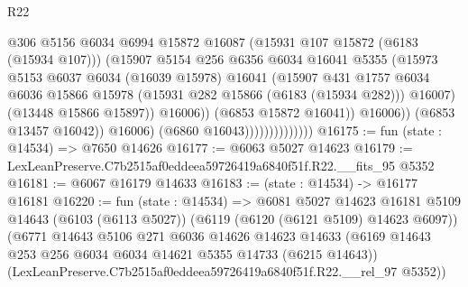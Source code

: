 \begin{lexlean}{R22}
\begin{coremodule}
                                          @306
                                          @5156
                                          @6034
                                          @6994
                                          @15872
                                          @16087
                                          (@15931 @107 @15872 (@6183 (@15934 @107)))
                                          (@15907
                                            @5154
                                            @256
                                            @6356
                                            @6034
                                            @16041
                                            @5355
                                            (@15973
                                              @5153
                                              @6037
                                              @6034
                                              (@16039 @15978)
                                              @16041
                                              (@15907
                                                @431
                                                @1757
                                                @6034
                                                @6036
                                                @15866
                                                @15978
                                                (@15931 @282 @15866 (@6183 (@15934 @282)))
                                                @16007)
                                              (@13448 @15866 @15897))
                                            @16006))
                                        (@6853 @15872 @16041))
                                      @16006))
                                  (@6853 @13457 @16042))
                                @16006)
                              (@6860 @16043))))))))))))))
@16175 := fun (state : @14534) => @7650 @14626
@16177 := @6063 @5027 @14623
@16179 := LexLeanPreserve.C7b2515af0eddeea59726419a6840f51f.R22.__fits_95 @5352
@16181 := @6067 @16179 @14633
@16183 := (state : @14534) -> @16177 @16181
@16220 := fun (state : @14534) =>
  @6081
    @5027
    @14623
    @16181
    @5109
    @14643
    (@6103 (@6113 @5027))
    (@6119 (@6120 (@6121 @5109) @14623 @6097))
    (@6771
      @14643
      @5106
      @271
      @6036
      @14626
      @14623
      @14633
      (@6169 @14643 @253 @256 @6034 @6034 @14621 @5355 @14733 (@6215 @14643))
      (LexLeanPreserve.C7b2515af0eddeea59726419a6840f51f.R22.__rel_97 @5352))

\end{coremodule}
\end{lexlean}
